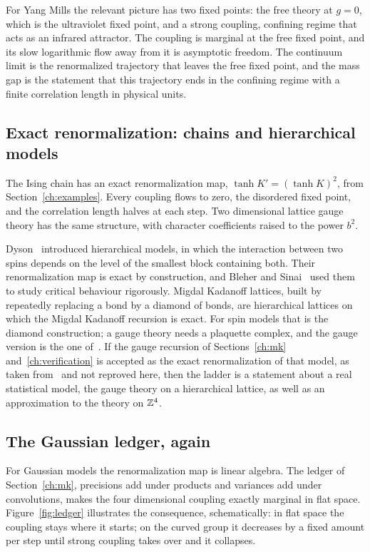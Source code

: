 For Yang Mills the relevant picture has two fixed points: the free theory at $g=0$, which is the ultraviolet fixed point, and a strong coupling, confining regime that acts as an infrared attractor. The coupling is marginal at the free fixed point, and its slow logarithmic flow away from it is asymptotic freedom. The continuum limit is the renormalized trajectory that leaves the free fixed point, and the mass gap is the statement that this trajectory ends in the confining regime with a finite correlation length in physical units.

\subsection{Exact renormalization: chains and hierarchical models}

The Ising chain has an exact renormalization map, $\tanh K'=(\tanh K)^2$, from Section~\ref{ch:examples}. Every coupling flows to zero, the disordered fixed point, and the correlation length halves at each step. Two dimensional lattice gauge theory has the same structure, with character coefficients raised to the power $b^2$.

Dyson~\cite{Dy69} introduced hierarchical models, in which the interaction between two spins depends on the level of the smallest block containing both. Their renormalization map is exact by construction, and Bleher and Sinai~\cite{BS73} used them to study critical behaviour rigorously. Migdal Kadanoff lattices, built by repeatedly replacing a bond by a diamond of bonds, are hierarchical lattices on which the Migdal Kadanoff recursion is exact. For spin models that is the diamond construction; a gauge theory needs a plaquette complex, and the gauge version is the one of~\cite{Ito85}. If the gauge recursion of Sections~\ref{ch:mk} and~\ref{ch:verification} is accepted as the exact renormalization of that model, as taken from~\cite{Ito85} and not reproved here, then the ladder is a statement about a real statistical model, the gauge theory on a hierarchical lattice, as well as an approximation to the theory on $\mathbb{Z}^4$.

\subsection{The Gaussian ledger, again}

For Gaussian models the renormalization map is linear algebra. The ledger of Section~\ref{ch:mk}, precisions add under products and variances add under convolutions, makes the four dimensional coupling exactly marginal in flat space. Figure~\ref{fig:ledger} illustrates the consequence, schematically: in flat space the coupling stays where it starts; on the curved group it decreases by a fixed amount per step until strong coupling takes over and it collapses.

